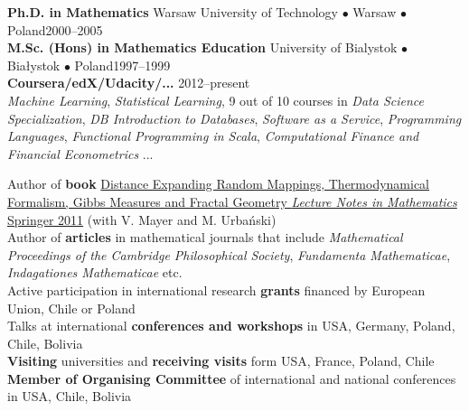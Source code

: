 \documentclass[a4paper, oneside]{scrreprt}
\begin{document}
\noindent\makebox[\linewidth]{\rule{\textwidth}{0.4pt}}

\vspace{0.6cm}

  
\noindent\textbf{Ph.D. in Mathematics} Warsaw University of Technology $\bullet$ Warsaw $\bullet$ Poland\hfill 2000--2005\\
\noindent\textbf{M.Sc. (Hons) in Mathematics Education} University of Bialystok $\bullet$ Białystok $\bullet$ Poland\hfill 1997--1999\\
\noindent\textbf{Coursera/edX/Udacity/...} \hfill 2012--present\\
\emph{Machine Learning}, 
\emph{Statistical Learning}, 9 out of 10 courses in \emph{Data Science Specialization}, 
\emph{DB Introduction to Databases}, \emph{Software as a Service}, 
\emph{Programming Languages}, \emph{Functional Programming in Scala}, 
\emph{Computational Finance and Financial Econometrics} ... \\

\noindent\makebox[\linewidth]{\rule{\textwidth}{0.4pt}}

\vspace{0.6cm}


\noindent\llap{\FA \faBook\ \ }Author of \textbf{book} \href{http://www.amazon.com/Distance-Expanding-Thermodynamical-Formalism-Mathematics/dp/3642236499/ref=sr_1_1?s=books&ie=UTF8&qid=1410309067&sr=1-1}{Distance Expanding Random Mappings, Thermodynamical Formalism, Gibbs Measures and Fractal Geometry \textit{Lecture Notes in Mathematics} Springer 2011} (with V. Mayer and M. Urbański)\\
\noindent\llap{\FA \faPencil\ \ }Author of \textbf{articles} in 
mathematical journals that include  
\textit{Mathematical Proceedings of the Cambridge Philosophical Society}, \textit{Fundamenta Mathematicae}, \textit{Indagationes Mathematicae} etc.\\
\noindent\llap{\FA \faFlask\ \ }Active participation in international research \textbf{grants} financed by European Union, Chile or Poland\\
\noindent\llap{\FA \faBullhorn\ \ }Talks at international 
\textbf{conferences and workshops} in USA, Germany, Poland, 
Chile, Bolivia\\
\noindent\llap{\FA \faExchange\ \ }\textbf{Visiting} 
universities and \textbf{receiving visits} form USA, France, Poland, Chile\\
\noindent\llap{\FA \faCalendar\ \ }\textbf{Member of Organising Committee} of international and national conferences in USA, Chile, Bolivia
\end{document}
